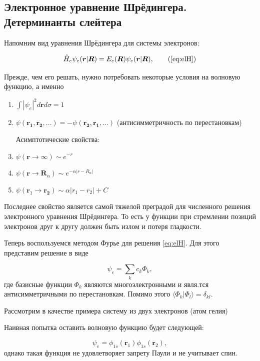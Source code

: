 \documentclass[12pt, oneside]{article}
\numberwithin{equation}{section}  %
\begin{document}
\subsection{Электронное уравнение Шрёдингера. Детерминанты слейтера}

Напомним вид уравнения Шрёдингера для системы электронов:

\[
\hat{H}_e \psi_e (\bm{r}| \bm{R} ) = E_e (\bm{R}) \psi_e (\bm{r}| \bm{R}), \tag{\ref{eq:elH}}
\]

Прежде, чем его решать, нужно потребовать некоторые условия на волновую функцию, а именно

\begin{enumerate}[label=\arabic*)]
\item \(\int |\psi_e|^2 d\bm{r}d\sigma = 1\)
\item \(\psi(\bm{r_1}, \bm{r_2}, \dots) = - \psi(\bm{r_2}, \bm{r_1}, \dots)\) (антисимметричность по перестановкам)

Асимптотические свойства:



\item \(\psi(\bm{r} \rightarrow \infty) \sim e ^{-r}\)
\item \(\psi(\bm{r} \rightarrow \bm{R}_\alpha) \sim e ^{- \alpha |r - R_\alpha|}\)
\item \(\psi(\bm{r}_1 \rightarrow \bm{r_2}) \sim \alpha |r_1 - r_2| + C\)
\end{enumerate}

Последнее свойство является самой тяжелой преградой для численного решения электронного уравнения Шрёдингера. То есть у функции при стремлении позиций электронов друг к другу должен быть излом и потеря гладкости.

Теперь воспользуемся методом Фурье для решения \eqref{eq:elH}. Для этого представим решение в виде

\begin{equation}
    \psi_e = \sum_k c_k \Phi_k,
\end{equation}
где базисные функции \(\Phi_k\) являются многоэлектронными и явля.тся антисимметричными по перестановкам. Помимо этого \(\langle \Phi_k | \Phi_l \rangle = \delta_{kl}\).

Рассмотрим в качестве примера систему из двух электронов (атом гелия)

Наивная попытка оставить волновую функцию будет следующей:

\begin{equation}
    \psi_e = \phi_{1s}(\bm{r}_1) \phi_{1s}(\bm{r}_2),
    \label{eq:psi_e_naive}
\end{equation}
однако такая функция не удовлетворяет запрету Паули и не учитывает спин.
\end{document}
